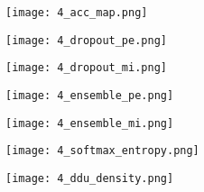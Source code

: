 \documentclass{article}
\begin{document}
\begin{figure*}[t!]

    \begin{subfigure}{0.13\linewidth}
        \centering
        \texttt{[image: 4\_acc\_map.png]}
    \end{subfigure}
    \begin{subfigure}{0.13\linewidth}
        \centering
        \texttt{[image: 4\_dropout\_pe.png]}
    \end{subfigure}
    \begin{subfigure}{0.13\linewidth}
        \centering
        \texttt{[image: 4\_dropout\_mi.png]}
    \end{subfigure}
    \begin{subfigure}{0.13\linewidth}
        \centering
        \texttt{[image: 4\_ensemble\_pe.png]}
    \end{subfigure}
    \begin{subfigure}{0.13\linewidth}
        \centering
        \texttt{[image: 4\_ensemble\_mi.png]}
    \end{subfigure}
    \begin{subfigure}{0.13\linewidth}
        \centering
        \texttt{[image: 4\_softmax\_entropy.png]}
    \end{subfigure}
    \begin{subfigure}{0.13\linewidth}
        \centering
        \texttt{[image: 4\_ddu\_density.png]}
    \end{subfigure}


\end{figure*}
\end{document}
